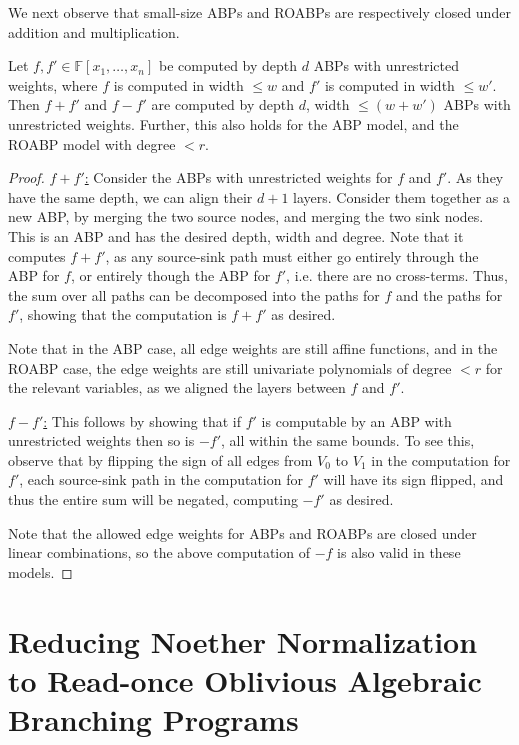 \documentclass[letterpaper,11pt]{article}
\numberwithin{equation}{section}
\theoremstyle{plain}
\theoremstyle{remark}
\newcommand{\F}{\mathbb{F}}
\begin{document}
We next observe that small-size ABPs and ROABPs are respectively closed under addition and multiplication.

\begin{lemma}
	\label{addROABP}
	Let $f,f'\in\F[x_1,\ldots,x_n]$ be computed by depth $d$ ABPs with unrestricted weights, where $f$ is computed in width $\le w$ and $f'$ is computed in width $\le w'$.  Then $f+f'$ and $f-f'$ are computed by depth $d$, width $\le (w+w')$ ABPs with unrestricted weights. Further, this also holds for the ABP model, and the ROABP model with degree $<r$.
\end{lemma}
\begin{proof}
	\uline{$f+f'$:} Consider the ABPs with unrestricted weights for $f$ and $f'$.  As they have the same depth, we can align their $d+1$ layers.  Consider them together as a new ABP, by merging the two source nodes, and merging the two sink nodes.  This is an ABP and has the desired depth, width and degree.  Note that it computes $f+f'$, as any source-sink path must either go entirely through the ABP for $f$, or entirely though the ABP for $f'$, i.e. there are no cross-terms.  Thus, the sum over all paths can be decomposed into the paths for $f$ and the paths for $f'$, showing that the computation is $f+f'$ as desired.

	Note that in the ABP case, all edge weights are still affine functions, and in the ROABP case, the edge weights are still univariate polynomials of degree $<r$ for the relevant variables, as we aligned the layers between $f$ and $f'$.

	\uline{$f-f'$:} This follows by showing that if $f'$ is computable by an ABP with unrestricted weights then so is $-f'$, all within the same bounds.  To see this, observe that by flipping the sign of all edges from $V_0$ to $V_1$ in the computation for $f'$, each source-sink path in the computation for $f'$ will have its sign flipped, and thus the entire sum will be negated, computing $-f'$ as desired.

	Note that the allowed edge weights for ABPs and ROABPs are closed under linear combinations, so the above computation of $-f$ is also valid in these models.
\end{proof}




\section{Reducing Noether Normalization to Read-once Oblivious Algebraic Branching Programs}\label{sec:main}
\end{document}
